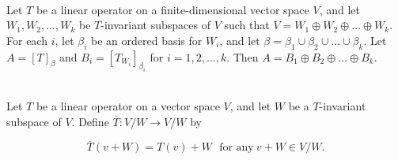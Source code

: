 \begin{theorem}
	\hfill\\
	Let $T$ be a linear operator on a finite-dimensional vector space $V$, and let $W_1, W_2, \dots, W_k$ be $T$-invariant subspaces of $V$ such that $V = W_1 \oplus W_2 \oplus \dots \oplus W_k$. For each $i$, let $\beta_i$ be an ordered basis for $W_i$, and let $\beta = \beta_1 \cup \beta_2 \cup \dots \cup \beta_k$. Let $A = [T]_\beta$ and $B_i = [T_{W_i}]_{\beta_i}$ for $i = 1, 2, \dots, k$. Then $A = B_1 \oplus B_2 \oplus \dots \oplus B_k$.
\end{theorem}

\begin{definition}
	\hfill\\
	Let $T$ be a linear operator on a vector space $V$, and let $W$ be a $T$-invariant subspace of $V$. Define $\overline{T}: V/W \to V/W$ by

	\[\overline{T}(v + W) = T(v) + W\ \ \ \text{for any}\ v + W \in V/W.\]
\end{definition}
